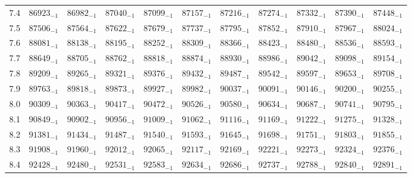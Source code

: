 \documentclass[10pt, a4paper]{article}
\begin{document}
\begin{center}
\begin{longtable}{c || c c c c c | c c c c c}
        7.4 & \({86923}_{-1}\) & \({86982}_{-1}\) & \({87040}_{-1}\) & \({87099}_{-1}\) & \({87157}_{-1}\) & \({87216}_{-1}\) & \({87274}_{-1}\) & \({87332}_{-1}\) & \({87390}_{-1}\) & \({87448}_{-1}\)\\
        7.5 & \({87506}_{-1}\) & \({87564}_{-1}\) & \({87622}_{-1}\) & \({87679}_{-1}\) & \({87737}_{-1}\) & \({87795}_{-1}\) & \({87852}_{-1}\) & \({87910}_{-1}\) & \({87967}_{-1}\) & \({88024}_{-1}\)\\
        7.6 & \({88081}_{-1}\) & \({88138}_{-1}\) & \({88195}_{-1}\) & \({88252}_{-1}\) & \({88309}_{-1}\) & \({88366}_{-1}\) & \({88423}_{-1}\) & \({88480}_{-1}\) & \({88536}_{-1}\) & \({88593}_{-1}\)\\
        7.7 & \({88649}_{-1}\) & \({88705}_{-1}\) & \({88762}_{-1}\) & \({88818}_{-1}\) & \({88874}_{-1}\) & \({88930}_{-1}\) & \({88986}_{-1}\) & \({89042}_{-1}\) & \({89098}_{-1}\) & \({89154}_{-1}\)\\
        7.8 & \({89209}_{-1}\) & \({89265}_{-1}\) & \({89321}_{-1}\) & \({89376}_{-1}\) & \({89432}_{-1}\) & \({89487}_{-1}\) & \({89542}_{-1}\) & \({89597}_{-1}\) & \({89653}_{-1}\) & \({89708}_{-1}\)\\
        7.9 & \({89763}_{-1}\) & \({89818}_{-1}\) & \({89873}_{-1}\) & \({89927}_{-1}\) & \({89982}_{-1}\) & \({90037}_{-1}\) & \({90091}_{-1}\) & \({90146}_{-1}\) & \({90200}_{-1}\) & \({90255}_{-1}\)\\
        8.0 & \({90309}_{-1}\) & \({90363}_{-1}\) & \({90417}_{-1}\) & \({90472}_{-1}\) & \({90526}_{-1}\) & \({90580}_{-1}\) & \({90634}_{-1}\) & \({90687}_{-1}\) & \({90741}_{-1}\) & \({90795}_{-1}\)\\
        8.1 & \({90849}_{-1}\) & \({90902}_{-1}\) & \({90956}_{-1}\) & \({91009}_{-1}\) & \({91062}_{-1}\) & \({91116}_{-1}\) & \({91169}_{-1}\) & \({91222}_{-1}\) & \({91275}_{-1}\) & \({91328}_{-1}\)\\
        8.2 & \({91381}_{-1}\) & \({91434}_{-1}\) & \({91487}_{-1}\) & \({91540}_{-1}\) & \({91593}_{-1}\) & \({91645}_{-1}\) & \({91698}_{-1}\) & \({91751}_{-1}\) & \({91803}_{-1}\) & \({91855}_{-1}\)\\
        8.3 & \({91908}_{-1}\) & \({91960}_{-1}\) & \({92012}_{-1}\) & \({92065}_{-1}\) & \({92117}_{-1}\) & \({92169}_{-1}\) & \({92221}_{-1}\) & \({92273}_{-1}\) & \({92324}_{-1}\) & \({92376}_{-1}\)\\
        8.4 & \({92428}_{-1}\) & \({92480}_{-1}\) & \({92531}_{-1}\) & \({92583}_{-1}\) & \({92634}_{-1}\) & \({92686}_{-1}\) & \({92737}_{-1}\) & \({92788}_{-1}\) & \({92840}_{-1}\) & \({92891}_{-1}\)\\

\end{longtable}
\end{center}
\end{document}
